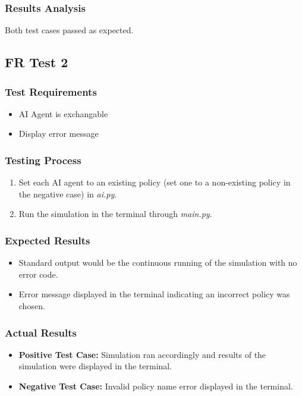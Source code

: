 \documentclass[12pt, titlepage]{article}
\begin{document}
\subsubsection{Results Analysis}
\item Both test cases passed as expected. 

\subsection{FR Test 2}
\subsubsection{Test Requirements}
\begin{itemize}
    \item AI Agent is exchangable
    \item Display error message
\end{itemize}
\subsubsection{Testing Process}
\begin{enumerate}
    \item Set each AI agent to an existing policy (set one to a non-existing policy in the negative case) in \textit{ai.py}.
    \item Run the simulation in the terminal through \textit{main.py}.
\end{enumerate}
\subsubsection{Expected Results}
\begin{itemize}
    \item Standard output would be the continuous running of the simulation with no error code.
    \item Error message displayed in the terminal indicating an incorrect policy was chosen.
\end{itemize}
\subsubsection{Actual Results}
\begin{itemize}
    \item \textbf{Positive Test Case:} Simulation ran accordingly and results of the simulation were displayed in the terminal.
    \item \textbf{Negative Test Case:} Invalid policy name error displayed in the terminal.
\end{itemize}
\end{document}
